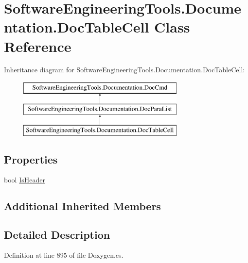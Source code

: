\hypertarget{class_software_engineering_tools_1_1_documentation_1_1_doc_table_cell}{\section{Software\+Engineering\+Tools.\+Documentation.\+Doc\+Table\+Cell Class Reference}
\label{class_software_engineering_tools_1_1_documentation_1_1_doc_table_cell}
}
Inheritance diagram for Software\+Engineering\+Tools.\+Documentation.\+Doc\+Table\+Cell\+:\begin{figure}[H]
\begin{center}
\leavevmode
\includegraphics[height=3.000000cm]{class_software_engineering_tools_1_1_documentation_1_1_doc_table_cell}
\end{center}
\end{figure}
\subsection*{Properties}
\begin{DoxyCompactItemize}
\item 
bool \hyperlink{class_software_engineering_tools_1_1_documentation_1_1_doc_table_cell_a7a00159fc2303f32540477f1ea4b7f59}{Is\+Header}
\end{DoxyCompactItemize}
\subsection*{Additional Inherited Members}


\subsection{Detailed Description}


Definition at line 895 of file Doxygen.\+cs.



